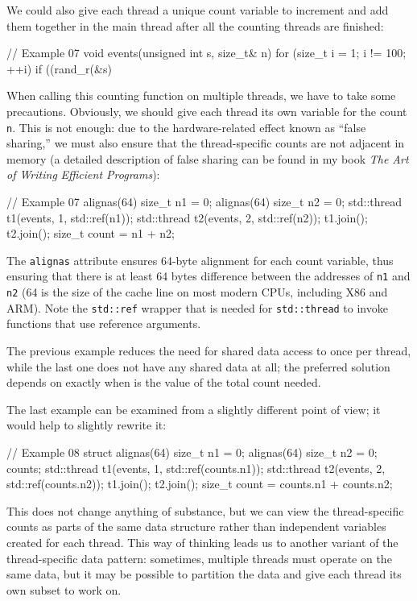 We could also give each thread a unique count variable to increment and add them together in the main thread after all the counting threads are finished:

\begin{code}
// Example 07
void events(unsigned int s, size_t& n) {
  for (size_t i = 1; i != 100; ++i) {
    if ((rand_r(&s) %
  }
}
\end{code}

When calling this counting function on multiple threads, we have to take some precautions. Obviously, we should give each thread its own variable for the count \texttt{n}. This is not enough: due to the hardware-related effect known as ``false sharing,'' we must also ensure that the thread-specific counts are not adjacent in memory (a detailed description of false sharing can be found in my book \emph{The Art of Writing} \emph{Efficient Programs}):

\begin{code}
// Example 07
alignas(64) size_t n1 = 0;
alignas(64) size_t n2 = 0;
std::thread t1(events, 1, std::ref(n1));
std::thread t2(events, 2, std::ref(n2));
t1.join();
t2.join();
size_t count = n1 + n2;
\end{code}

The \texttt{alignas} attribute ensures 64-byte alignment for each count variable, thus ensuring that there is at least 64 bytes difference between the addresses of \texttt{n1} and \texttt{n2} (64 is the size of the cache line on most modern CPUs, including X86 and ARM). Note the \texttt{std::ref} wrapper that is needed for \texttt{std::thread} to invoke functions that use reference arguments.

The previous example reduces the need for shared data access to once per thread, while the last one does not have any shared data at all; the preferred solution depends on exactly when is the value of the total count needed.

The last example can be examined from a slightly different point of view; it would help to slightly rewrite it:

\begin{code}
// Example 08
struct {
  alignas(64) size_t n1 = 0;
  alignas(64) size_t n2 = 0;
} counts;
std::thread t1(events, 1, std::ref(counts.n1));
std::thread t2(events, 2, std::ref(counts.n2));
t1.join();
t2.join();
size_t count = counts.n1 + counts.n2;
\end{code}

This does not change anything of substance, but we can view the thread-specific counts as parts of the same data structure rather than independent variables created for each thread. This way of thinking leads us to another variant of the thread-specific data pattern: sometimes, multiple threads must operate on the same data, but it may be possible to partition the data and give each thread its own subset to work on.

